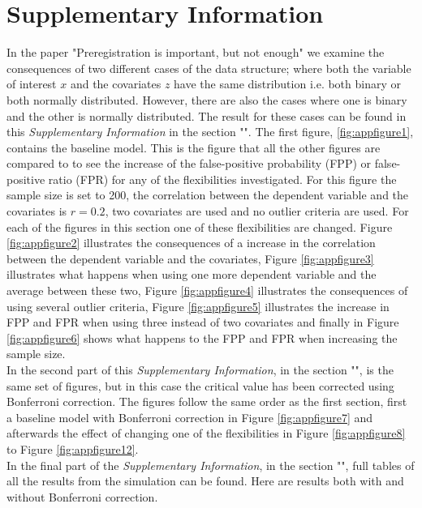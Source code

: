 \section{Supplementary Information} 
\setcounter{table}{0}
\setcounter{figure}{0}
\renewcommand*{\thepage}{\arabic{page}}
\renewcommand{\thetable}{S\arabic{table}}
\renewcommand{\thefigure}{S\arabic{figure}}

In the paper "Preregistration is important, but not enough" we examine the consequences of two different cases of the data structure; where both the variable of interest $x$ and the covariates $z$ have the same distribution i.e. both binary or both normally distributed. However, there are also the cases where one is binary and the other is normally distributed. The result for these cases can be found in this \textit{Supplementary Information} in the section "". The first figure, \ref{fig:appfigure1}, contains the baseline model. This is the figure that all the other figures are compared to to see the increase of the false-positive probability (FPP) or false-positive ratio (FPR) for any of the flexibilities investigated. For this figure the sample size is set to 200, the correlation between the dependent variable and the covariates is $\textit{r}=0.2$, two covariates are used and no outlier criteria are used. For each of the figures in this section one of these flexibilities are changed. Figure \ref{fig:appfigure2} illustrates the consequences of a increase in the correlation between the dependent variable and the covariates, Figure \ref{fig:appfigure3} illustrates what happens when using one more dependent variable and the average between these two, Figure \ref{fig:appfigure4} illustrates the consequences of using several outlier criteria, Figure \ref{fig:appfigure5} illustrates the increase in FPP and FPR when using three instead of two covariates and finally in Figure \ref{fig:appfigure6} shows what happens to the FPP and FPR when increasing the sample size.  \\

In the second part of this \textit{Supplementary Information}, in the section "", is the same set of figures, but in this case the critical value has been corrected using Bonferroni correction. The figures follow the same order as the first section, first a baseline model with Bonferroni correction in Figure \ref{fig:appfigure7} and afterwards the effect of changing one of the flexibilities in Figure \ref{fig:appfigure8} to Figure \ref{fig:appfigure12}. \\
In the final part of the \textit{Supplementary Information}, in the section "", full tables of all the results from the simulation can be found. Here are  results both with and without Bonferroni correction.\\
\newpage

